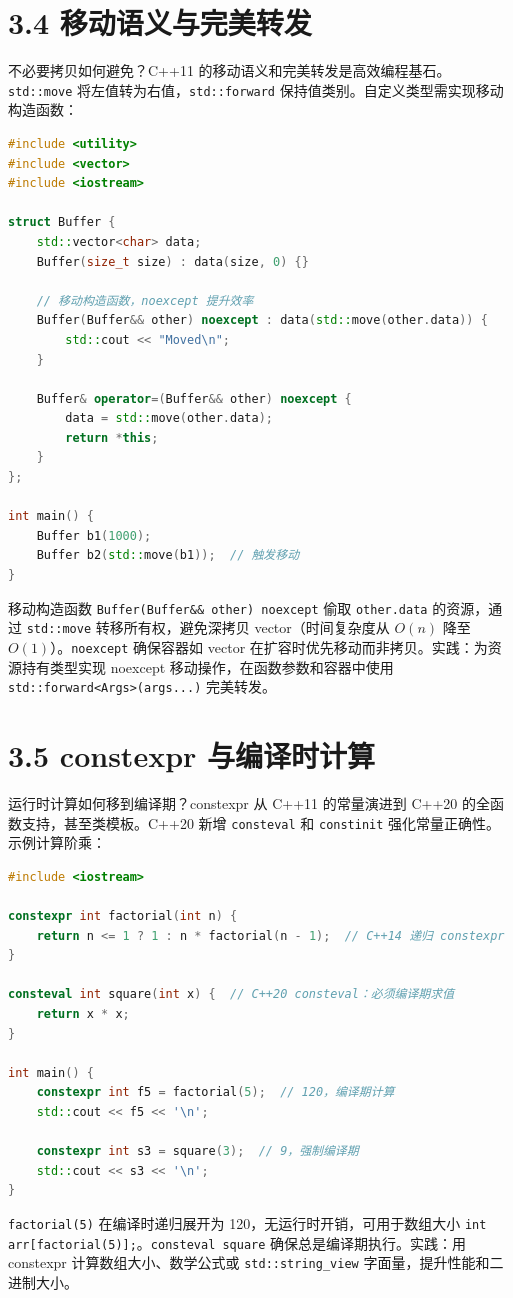 \section{3.4 移动语义与完美转发}
不必要拷贝如何避免？C++11 的移动语义和完美转发是高效编程基石。\texttt{std::move} 将左值转为右值，\texttt{std::forward} 保持值类别。自定义类型需实现移动构造函数：\par
\begin{lstlisting}[language=cpp]
#include <utility>
#include <vector>
#include <iostream>

struct Buffer {
    std::vector<char> data;
    Buffer(size_t size) : data(size, 0) {}
    
    // 移动构造函数，noexcept 提升效率
    Buffer(Buffer&& other) noexcept : data(std::move(other.data)) {
        std::cout << "Moved\n";
    }
    
    Buffer& operator=(Buffer&& other) noexcept {
        data = std::move(other.data);
        return *this;
    }
};

int main() {
    Buffer b1(1000);
    Buffer b2(std::move(b1));  // 触发移动
}
\end{lstlisting}
移动构造函数 \texttt{Buffer(Buffer\&{}\&{} other) noexcept} 偷取 \texttt{other.data} 的资源，通过 \texttt{std::move} 转移所有权，避免深拷贝 vector（时间复杂度从 $O(n)$ 降至 $O(1)$）。\texttt{noexcept} 确保容器如 vector 在扩容时优先移动而非拷贝。实践：为资源持有类型实现 noexcept 移动操作，在函数参数和容器中使用 \texttt{std::forward<Args>(args...)} 完美转发。\par
\section{3.5 constexpr 与编译时计算}
运行时计算如何移到编译期？constexpr 从 C++11 的常量演进到 C++20 的全函数支持，甚至类模板。C++20 新增 \texttt{consteval} 和 \texttt{constinit} 强化常量正确性。示例计算阶乘：\par
\begin{lstlisting}[language=cpp]
#include <iostream>

constexpr int factorial(int n) {
    return n <= 1 ? 1 : n * factorial(n - 1);  // C++14 递归 constexpr
}

consteval int square(int x) {  // C++20 consteval：必须编译期求值
    return x * x;
}

int main() {
    constexpr int f5 = factorial(5);  // 120，编译期计算
    std::cout << f5 << '\n';
    
    constexpr int s3 = square(3);  // 9，强制编译期
    std::cout << s3 << '\n';
}
\end{lstlisting}
\texttt{factorial(5)} 在编译时递归展开为 120，无运行时开销，可用于数组大小 \texttt{int arr[factorial(5)];}。\texttt{consteval square} 确保总是编译期执行。实践：用 constexpr 计算数组大小、数学公式或 \texttt{std::string\_{}view} 字面量，提升性能和二进制大小。\par
